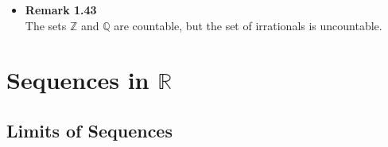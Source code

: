 \documentclass[11pt,a4paper]{article}
\begin{document}
\begin{itemize}
    \item \textbf{Remark 1.43} \\
        The sets $\mathbb{Z}$ and $\mathbb{Q}$ are countable, but the set of irrationals is
        uncountable.

\end{itemize}

\break{}

\section{Sequences in $\mathbb{R}$}

\subsection{Limits of Sequences}
\end{document}
